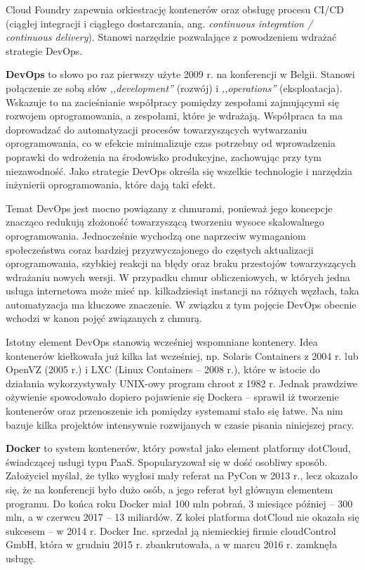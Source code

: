 \documentclass[12pt,a4paper,twoside,titlepage,openright]{book}
\begin{document}
Cloud Foundry zapewnia orkiestrację kontenerów oraz obsługę procesu CI/CD (ciągłej integracji i ciągłego dostarczania, ang. \textit{continuous integration / continuous delivery}).\cite{cloudFoundry} Stanowi narzędzie pozwalające z powodzeniem wdrażać strategie DevOps. 

\textbf{DevOps} to słowo po raz pierwszy użyte 2009 r. na konferencji w Belgii. Stanowi połączenie ze sobą słów \textit{,,development''} (rozwój) i \textit{,,operations''} (eksploatacja). Wskazuje to na zacieśnianie współpracy pomiędzy zespołami zajmującymi się rozwojem oprogramowania, a zespołami, które je wdrażają. Współpraca ta ma doprowadzać do automatyzacji procesów towarzyszących wytwarzaniu oprogramowania, co w efekcie minimalizuje czas potrzebny od wprowadzenia poprawki do wdrożenia na środowisko produkcyjne, zachowując przy tym niezawodność. Jako strategie DevOps określa się wszelkie technologie i narzędzia inżynierii oprogramowania, które dają taki efekt. \cite{devOpsPackt}

Temat DevOps jest mocno powiązany z chmurami, ponieważ jego koncepcje znacząco redukują złożoność towarzyszącą tworzeniu wysoce skalowalnego oprogramowania. Jednocześnie wychodzą one naprzeciw wymaganiom społeczeństwa coraz bardziej przyzwyczajonego do częstych aktualizacji oprogramowania, szybkiej reakcji na błędy oraz braku przestojów towarzyszących wdrażaniu nowych wersji. W przypadku chmur obliczeniowych, w których jedna usługa internetowa może mieć np. kilkadziesiąt instancji na różnych węzłach, taka automatyzacja ma kluczowe znaczenie. W związku z tym pojęcie DevOps obecnie wchodzi w kanon pojęć związanych z chmurą.

Istotny element DevOps stanowią wcześniej wspomniane kontenery. Idea kontenerów kiełkowała już kilka lat wcześniej, np. Solaris Containers z 2004 r. lub OpenVZ (2005 r.) i LXC (Linux Containers -- 2008 r.), które w istocie do działania wykorzystywały UNIX-owy program chroot z 1982 r.\cite{siteOperatingSystemVirtualizationWiki} Jednak prawdziwe ożywienie spowodowało dopiero pojawienie się Dockera -- sprawił iż tworzenie kontenerów oraz przenoszenie ich pomiędzy systemami stało się łatwe. Na nim bazuje kilka projektów intensywnie rozwijanych w czasie pisania niniejszej pracy.

\textbf{Docker} to system kontenerów, który powstał jako element platformy dotCloud, świadczącej usługi typu PaaS. Spopularyzował się w dość osobliwy sposób. Założyciel myślał, że tylko wygłosi mały referat na PyCon w 2013 r., lecz okazało się, że na konferencji było dużo osób, a jego referat był głównym elementem programu. Do końca roku Docker miał 100 mln pobrań, 3 miesiące później -- 300 mln, a w czerwcu 2017 -- 13 miliardów.\cite{siteDockerHistory} Z kolei platforma dotCloud nie okazała się sukcesem -- w 2014 r. Docker Inc. sprzedał ją niemieckiej firmie cloudControl GmbH, która w grudniu 2015 r. zbankrutowała, a w marcu 2016 r. zamknęła usługę.\cite{siteCloudControlWiki}
\end{document}
